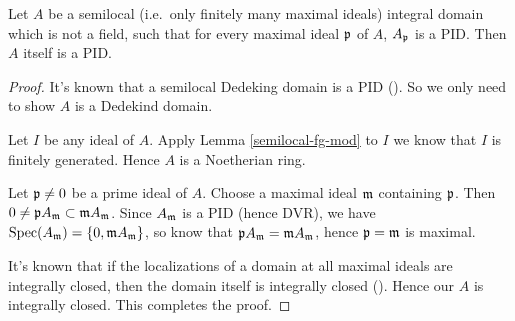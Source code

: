 \begin{lem}
\label{semilocal-PID}
\leanok
Let $A$ be a semilocal (i.e.~only finitely many maximal ideals)
integral domain which is not a field,
such that for every maximal ideal ${\mathfrak{p}}$ of $A$, $A_{\mathfrak{p}}$ is a PID.
Then $A$ itself is a PID.
\end{lem}

\begin{proof}
It's known that a semilocal Dedeking domain is a PID
().
So we only need to show $A$ is a Dedekind domain.

Let $I$ be any ideal of $A$. Apply Lemma \ref{semilocal-fg-mod} to $I$ we know that
$I$ is finitely generated. Hence $A$ is a Noetherian ring.

Let ${\mathfrak{p}}\neq 0$ be a prime ideal of $A$.
Choose a maximal ideal ${\mathfrak{m}}$ containing ${\mathfrak{p}}$.
Then $0\neq{\mathfrak{p}} A_{\mathfrak{m}}\subset{\mathfrak{m}} A_{\mathfrak{m}}$. Since $A_{\mathfrak{m}}$ is a PID
(hence DVR), we have
${\mathrm{Spec}}(A_{\mathfrak{m}})=\{0,{\mathfrak{m}} A_{\mathfrak{m}}\}$,
so know that ${\mathfrak{p}} A_{\mathfrak{m}}={\mathfrak{m}} A_{\mathfrak{m}}$, hence ${\mathfrak{p}}={\mathfrak{m}}$ is maximal.

It's known that if the localizations of a domain at all maximal ideals
are integrally closed, then the domain itself is integrally closed
().
Hence our $A$ is integrally closed. This completes the proof.
\end{proof}

